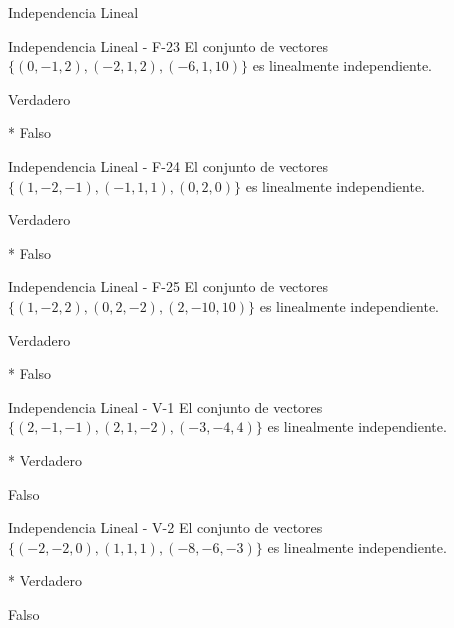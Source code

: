 \documentclass[a4,11pt]{aleph-notas}
\begin{document}
\begin{quiz}{Independencia Lineal}
\begin{multi}[numbering = none, shuffle = false]%
    {Independencia Lineal - F-23}
    El conjunto de vectores $\{ (0,-1,2) , (-2,1,2), (-6, 1, 10) \}$ es linealmente independiente.
    \item[] Verdadero 
    \item[]* Falso
\end{multi}

\begin{multi}[numbering = none, shuffle = false]%
    {Independencia Lineal - F-24}
    El conjunto de vectores $\{ (1,-2,-1) , (-1,1,1), (0, 2, 0) \}$ es linealmente independiente.
    \item[] Verdadero 
    \item[]* Falso
\end{multi}

\begin{multi}[numbering = none, shuffle = false]%
    {Independencia Lineal - F-25}
    El conjunto de vectores $\{ (1,-2,2) , (0,2,-2), (2, -10, 10) \}$ es linealmente independiente.
    \item[] Verdadero 
    \item[]* Falso
\end{multi}

\begin{multi}[numbering = none, shuffle = false]%
    {Independencia Lineal - V-1}
    El conjunto de vectores $\{ (2,-1,-1) , (2,1,-2), (-3, -4, 4) \}$ es linealmente independiente.
    \item[]* Verdadero 
    \item[] Falso
\end{multi}

\begin{multi}[numbering = none, shuffle = false]%
    {Independencia Lineal - V-2}
    El conjunto de vectores $\{ (-2,-2,0) , (1,1,1), (-8, -6, -3) \}$ es linealmente independiente.
    \item[]* Verdadero 
    \item[] Falso
\end{multi}


\end{quiz}
\end{document}
